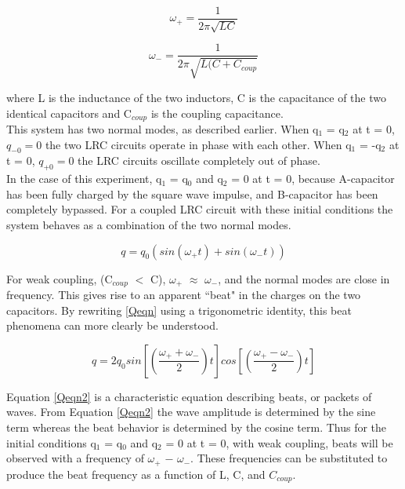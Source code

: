 \documentclass[aps,prl,reprint]{revtex4-2}
\begin{document}
\begin{equation} 
\omega_+ = \frac{1}{2\pi\sqrt{LC}}
\label{omegaplus}
\end{equation}

\begin{equation} 
\omega_- = \frac{1}{2\pi\sqrt{L(C+C_{coup}}}
\label{omegaminus}
\end{equation}

where L is the inductance of the two inductors, C is the capacitance of the
two identical capacitors and C$_{coup}$ is the coupling capacitance.  \\

This system has two normal modes, as described earlier. When q$_1$ = q$_2$
at t = 0, $q_{-0}=0$ the two LRC circuits operate in phase with each other.
When q$_1$ = -q$_2$ at t = 0, $q_{+0} = 0$ the LRC circuits oscillate 
completely out of phase.\\

In the case of this experiment, q$_1$ = q$_0$ and q$_2$ = 0 at t = 0, because
A-capacitor has been fully charged by the square wave impulse, and B-capacitor
has been completely bypassed. For a coupled LRC circuit with these initial 
conditions the system behaves as a combination of the two normal modes.

\begin{equation} 
q = q_0(sin(\omega_{+}t)+sin(\omega_{-}t))
\label{Qeqn}
\end{equation}

For weak coupling, (C$_{coup}$  $<$ C), $\omega_{+}$ $\approx$ $\omega_{-}$,
and the normal modes are close in frequency. This gives rise to an apparent
``beat" in the charges on the two capacitors. By rewriting \ref{Qeqn} using
a trigonometric identity, this beat phenomena can more clearly be understood.

\begin{equation} 
q = 2q_0sin[(\frac{\omega_{+}+\omega_{-}}{2})t]cos[(\frac{\omega_{+}-\omega_{-}}{2})t]
\label{Qeqn2}
\end{equation}

Equation \ref{Qeqn2} is a characteristic equation describing beats,
or packets of waves. From Equation \ref{Qeqn2} the wave amplitude is 
determined by the sine term whereas the beat behavior is determined
by the cosine term. Thus for the initial conditions q$_1$ = q$_0$ and
q$_2$ = 0 at t = 0, with weak coupling, beats will be observed with a
frequency of $\omega_{+}$ $-$ $\omega_{-}$. These frequencies can
be substituted to produce the beat frequency as a function of
L, C, and $C_{coup}$.
\end{document}
